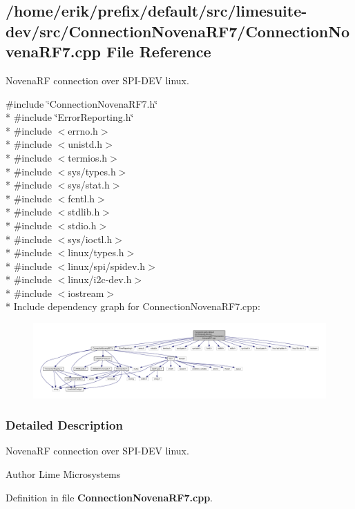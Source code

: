 \subsection{/home/erik/prefix/default/src/limesuite-\/dev/src/\+Connection\+Novena\+R\+F7/\+Connection\+Novena\+R\+F7.cpp File Reference}
\label{ConnectionNovenaRF7_8cpp}


Novena\+RF connection over S\+P\+I-\/\+D\+EV linux.  


{\ttfamily \#include \char`\"{}Connection\+Novena\+R\+F7.\+h\char`\"{}}\\*
{\ttfamily \#include \char`\"{}Error\+Reporting.\+h\char`\"{}}\\*
{\ttfamily \#include $<$errno.\+h$>$}\\*
{\ttfamily \#include $<$unistd.\+h$>$}\\*
{\ttfamily \#include $<$termios.\+h$>$}\\*
{\ttfamily \#include $<$sys/types.\+h$>$}\\*
{\ttfamily \#include $<$sys/stat.\+h$>$}\\*
{\ttfamily \#include $<$fcntl.\+h$>$}\\*
{\ttfamily \#include $<$stdlib.\+h$>$}\\*
{\ttfamily \#include $<$stdio.\+h$>$}\\*
{\ttfamily \#include $<$sys/ioctl.\+h$>$}\\*
{\ttfamily \#include $<$linux/types.\+h$>$}\\*
{\ttfamily \#include $<$linux/spi/spidev.\+h$>$}\\*
{\ttfamily \#include $<$linux/i2c-\/dev.\+h$>$}\\*
{\ttfamily \#include $<$iostream$>$}\\*
Include dependency graph for Connection\+Novena\+R\+F7.\+cpp\+:
\nopagebreak
\begin{figure}[H]
\begin{center}
\leavevmode
\includegraphics[width=350pt]{dd/da8/ConnectionNovenaRF7_8cpp__incl}
\end{center}
\end{figure}


\subsubsection{Detailed Description}
Novena\+RF connection over S\+P\+I-\/\+D\+EV linux. 

\begin{DoxyAuthor}{Author}
Lime Microsystems 
\end{DoxyAuthor}


Definition in file {\bf Connection\+Novena\+R\+F7.\+cpp}.

